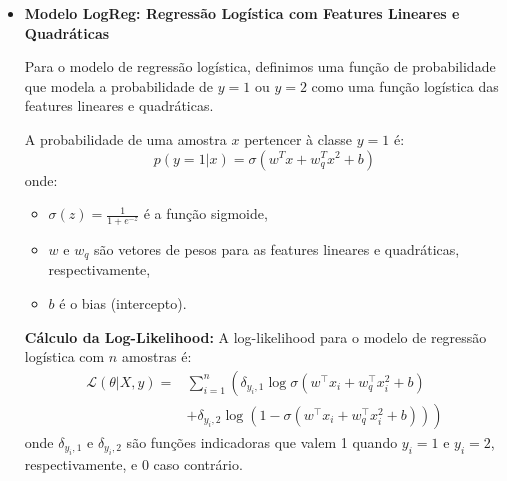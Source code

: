 \begin{enumerate}
\begin{tcolorbox}[title=Resposta (continuação):]
\begin{itemize}
        
        

        \end{itemize}
        
        \end{tcolorbox}

        \begin{tcolorbox}[title=Resposta (continuação):]

            \begin{itemize}
        
                \item \textbf{Modelo LogReg: Regressão Logística com Features Lineares e Quadráticas}
            
                Para o modelo de regressão logística, definimos uma função de probabilidade que modela a probabilidade de \( y = 1 \) ou \( y = 2 \) como uma função logística das features lineares e quadráticas.
            
                A probabilidade de uma amostra \( x \) pertencer à classe \( y = 1 \) é:
                \[
                p(y=1|x) = \sigma(w^T x + w_q^T x^2 + b)
                \]
                onde:
                \begin{itemize}
                    \item \( \sigma(z) = \frac{1}{1 + e^{-z}} \) é a função sigmoide,
                    \item \( w \) e \( w_q \) são vetores de pesos para as features lineares e quadráticas, respectivamente,
                    \item \( b \) é o bias (intercepto).
                \end{itemize}
            
                \textbf{Cálculo da Log-Likelihood:}  
                A log-likelihood para o modelo de regressão logística com \( n \) amostras é:
                \[
                \begin{aligned}
                    \mathcal{L}(\theta | X, y) = & \sum_{i=1}^n \left( \delta_{y_i,1} \log \sigma(w^\top x_i + w_q^\top x_i^2 + b) \right. \\ 
                    & \left. + \delta_{y_i,2} \log (1 - \sigma(w^\top x_i + w_q^\top x_i^2 + b)) \right)
                \end{aligned}
                \]
                onde \( \delta_{y_i,1} \) e \( \delta_{y_i,2} \) são funções indicadoras que valem 1 quando \( y_i = 1 \) e \( y_i = 2 \), respectivamente, e 0 caso contrário.
    

\end{itemize}
\end{tcolorbox}
\end{enumerate}
